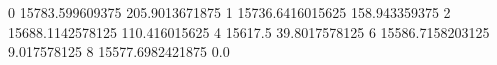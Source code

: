 0 15783.599609375 205.9013671875
1 15736.6416015625 158.943359375
2 15688.1142578125 110.416015625
4 15617.5 39.8017578125
6 15586.7158203125 9.017578125
8 15577.6982421875 0.0
